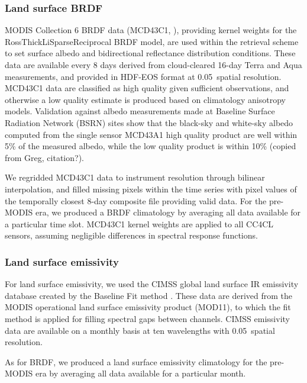 \subsubsection{Land surface BRDF}\label{sec:BRDF}

MODIS Collection 6 BRDF data (MCD43C1, \citet{MODIS_BRDF}), providing kernel weights for the RossThickLiSparseReciprocal BRDF model, are used within the retrieval scheme to set surface albedo and bidirectional reflectance distribution conditions. These data are available every 8 days derived from cloud-cleared 16-day Terra and Aqua measurements, and provided in HDF-EOS format at 0.05\textdegree\ spatial resolution. MCD43C1 data are classified as high quality given sufficient observations, and otherwise a low quality estimate is produced based on climatology anisotropy models. Validation against albedo measurements made at Baseline Surface Radiation Network (BSRN) sites show that the black-sky and white-sky albedo computed from the single sensor MCD43A1 high quality product are well within 5\% of the measured albedo, while the low quality product is within 10\% (copied from Greg, citation?).

We regridded MCD43C1 data to instrument resolution through bilinear interpolation, and filled missing pixels within the time series with pixel values of the temporally closest 8-day composite file providing valid data. For the pre-MODIS era, we produced a BRDF climatology by averaging all data available for a particular time slot. MCD43C1 kernel weights are applied to all CC4CL sensors, assuming negligible differences in spectral response functions. 

\subsubsection{Land surface emissivity}\label{sec:emissivity}

For land surface emissivity, we used the CIMSS global land surface IR emissivity database created by the Baseline Fit method \citep{Seemann08}. These data are derived from the MODIS operational land surface emissivity product (MOD11), to which the fit method is applied for filling spectral gaps between channels. CIMSS emissivity data are available on a monthly basis at ten wavelengths with 0.05\textdegree\ spatial resolution.

As for BRDF, we produced a land surface emissivity climatology for the pre-MODIS era by averaging all data available for a particular month.

